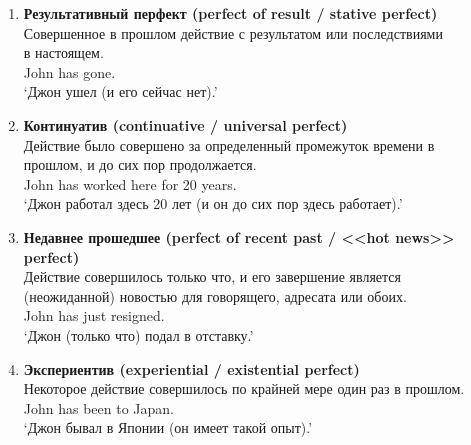 \begin{enumerate}
    \item \textbf{Результативный перфект (perfect of result / stative perfect)}\\
    Совершенное в прошлом действие с результатом или последствиями \\ в настоящем.\\
    John has gone.\\
    `Джон ушел (и его сейчас нет).'
    \item \textbf{Континуатив (continuative / universal perfect)}\\
    Действие было совершено за определенный промежуток времени в \\ прошлом, и до сих пор продолжается.\\
    John has worked here for 20 years.\\
    `Джон работал здесь 20 лет (и он до сих пор здесь работает).'
    \item \textbf{Недавнее прошедшее (perfect of recent past / <<hot news>> perfect)}\\
    Действие совершилось только что, и его завершение является \\ (неожиданной) новостью для говорящего, адресата или обоих.\\
    John has just resigned.\\
    `Джон (только что) подал в отставку.'
    \item \textbf{Экспериентив (experiential / existential perfect)}\\
    Некоторое действие совершилось по крайней мере один раз в прошлом.\\
	John has been to Japan.\\
	`Джон бывал в Японии (он имеет такой опыт).'
\end{enumerate}
 
